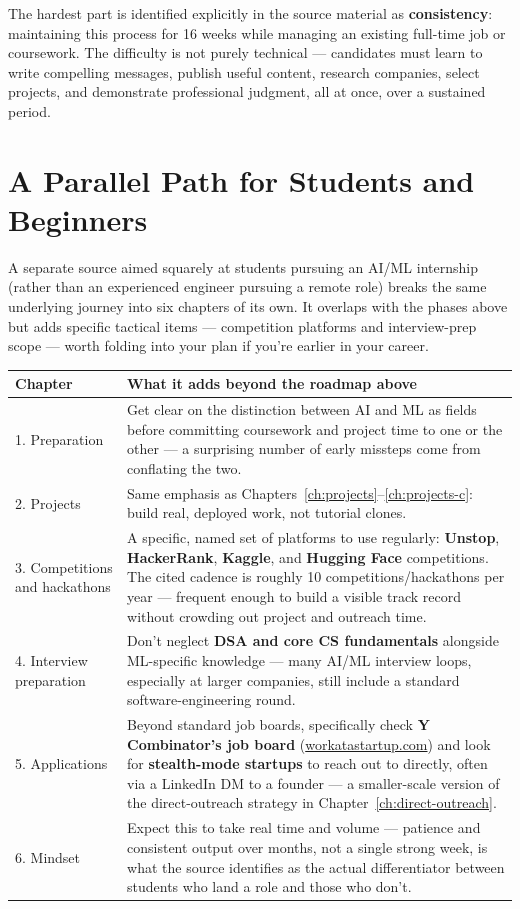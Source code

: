 \begin{keytakeaway}
The hardest part is identified explicitly in the source material as \textbf{consistency}: maintaining this
process for 16 weeks while managing an existing full-time job or coursework. The difficulty is not purely
technical --- candidates must learn to write compelling messages, publish useful content, research companies,
select projects, and demonstrate professional judgment, all at once, over a sustained period.
\end{keytakeaway}

\section{A Parallel Path for Students and Beginners}

A separate source aimed squarely at students pursuing an AI/ML internship (rather than an experienced engineer
pursuing a remote role) breaks the same underlying journey into six chapters of its own. It overlaps with the
phases above but adds specific tactical items — competition platforms and interview-prep scope — worth folding
into your plan if you're earlier in your career.

\begin{longtable}{p{} p{}}
\toprule
\textbf{Chapter} & \textbf{What it adds beyond the roadmap above} \\
\midrule
\endhead
1. Preparation & Get clear on the distinction between AI and ML as fields before committing coursework and
project time to one or the other — a surprising number of early missteps come from conflating the two. \\
2. Projects & Same emphasis as Chapters~\ref{ch:projects}--\ref{ch:projects-c}: build real, deployed work, not
tutorial clones. \\
3. Competitions and hackathons & A specific, named set of platforms to use regularly: \textbf{Unstop},
\textbf{HackerRank}, \textbf{Kaggle}, and \textbf{Hugging Face} competitions. The cited cadence is roughly 10
competitions/hackathons per year — frequent enough to build a visible track record without crowding out project
and outreach time. \\
4. Interview preparation & Don't neglect \textbf{DSA and core CS fundamentals} alongside ML-specific knowledge —
many AI/ML interview loops, especially at larger companies, still include a standard software-engineering
round. \\
5. Applications & Beyond standard job boards, specifically check \textbf{Y Combinator's job board}
(\url{workatastartup.com}) and look for \textbf{stealth-mode startups} to reach out to directly, often via a
LinkedIn DM to a founder — a smaller-scale version of the direct-outreach strategy in
Chapter~\ref{ch:direct-outreach}. \\
6. Mindset & Expect this to take real time and volume — patience and consistent output over months, not a
single strong week, is what the source identifies as the actual differentiator between students who land a role
and those who don't. \\
\bottomrule
\end{longtable}

